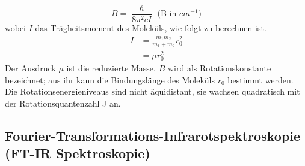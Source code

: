 \documentclass[12pt]{article}
\begin{document}
\begin{equation}
\label{eq:bconst}
B = \frac{\hslash}{8 \pi ^2 c I} \,\,  \text{(B in } cm^{-1})  
\end{equation}
wobei $I$ das Trägheitsmoment des Moleküls, 
wie folgt zu berechnen ist.
\begin{align}
\label{eq:trag}
I &=\frac{m_1 m_2 }{m_1 + m_2} r_0^2\\
&=\mu r_0^2
\end{align}
Der Ausdruck $\mu$ ist die reduzierte Masse.
$B$ wird als Rotationskonstante bezeichnet; aus ihr kann die Bindungslänge des Moleküls
$r_0$ bestimmt werden. Die Rotationsenergieniveaus sind nicht äquidistant, sie
wachsen quadratisch mit der Rotationsquantenzahl J an.

\subsection{ Fourier-Transformations-Infrarotspektroskopie (FT-IR Spektroskopie)~\supercite{harris}}
\end{document}
